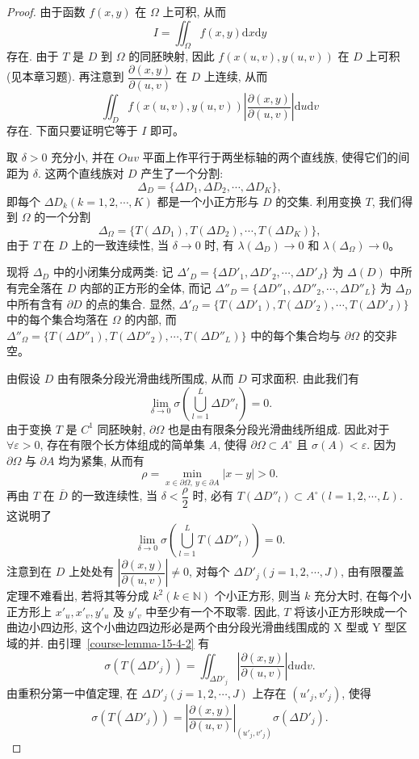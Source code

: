 \documentclass[UTF8,12pt,a4paper,fontset=fandol]{ctexart}
\begin{document}
\begin{proof}\quad 由于函数 $f(x,y)$ 在 $\Omega$ 上可积, 从而
\[
  I=\iint_\Omega f(x,y)\mathrm dx\mathrm dy
\]
存在. 由于 $T$ 是 $D$ 到 $\Omega$ 的同胚映射, 因此 $f(x(u,v),y(u,v))$ 在 $D$ 上可积(见本章习题). 再注意到 $\dfrac{\partial(x,y)}{\partial(u,v)}$ 在 $D$ 上连续, 从而
\[
  \iint_D f(x(u,v),y(u,v))
  \left|\frac{\partial(x,y)}{\partial(u,v)}\right|\mathrm du\mathrm dv
\]
存在. 下面只要证明它等于 $I$ 即可。

取 $\delta>0$ 充分小, 并在 $Ouv$ 平面上作平行于两坐标轴的两个直线族, 使得它们的间距为 $\delta$. 这两个直线族对 $D$ 产生了一个分割:
\[
  \Delta_D=\{\Delta D_1,\Delta D_2,\cdots,\Delta D_K\},
\]
即每个 $\Delta D_k(k=1,2,\cdots,K)$ 都是一个小正方形与 $D$ 的交集. 利用变换 $T$, 我们得到 $\Omega$ 的一个分割
\[
  \Delta_\Omega=\{T(\Delta D_1),T(\Delta D_2),\cdots,T(\Delta D_K)\},
\]
由于 $T$ 在 $D$ 上的一致连续性, 当 $\delta\to0$ 时, 有 $\lambda(\Delta_D)\to0$ 和 $\lambda(\Delta_\Omega)\to0$。

现将 $\Delta_D$ 中的小闭集分成两类: 记 $\Delta'_D=\{\Delta D'_1,\Delta D'_2,\cdots,\Delta D'_J\}$ 为 $\Delta(D)$ 中所有完全落在 $D$ 内部的正方形的全体, 而记 $\Delta''_D=\{\Delta D''_1,\Delta D''_2,\cdots,\Delta D''_L\}$ 为 $\Delta_D$ 中所有含有 $\partial D$ 的点的集合. 显然, $\Delta'_\Omega=\{T(\Delta D'_1),T(\Delta D'_2),\cdots,T(\Delta D'_J)\}$ 中的每个集合均落在 $\Omega$ 的内部, 而 $\Delta''_\Omega=\{T(\Delta D''_1),T(\Delta D''_2),\cdots,T(\Delta D''_L)\}$ 中的每个集合均与 $\partial\Omega$ 的交非空。

由假设 $D$ 由有限条分段光滑曲线所围成, 从而 $D$ 可求面积. 由此我们有
\[
  \lim_{\delta\to0}\sigma\left(\bigcup_{l=1}^L\Delta D''_l\right)=0.
\]
由于变换 $T$ 是 $C^1$ 同胚映射, $\partial\Omega$ 也是由有限条分段光滑曲线所组成. 因此对于 $\forall\varepsilon>0$, 存在有限个长方体组成的简单集 $A$, 使得 $\partial\Omega\subset A^\circ$ 且 $\sigma(A)<\varepsilon$. 因为 $\partial\Omega$ 与 $\partial A$ 均为紧集, 从而有
\[
  \rho=\min_{x\in\partial\Omega,\ y\in\partial A}|x-y|>0.
\]
再由 $T$ 在 $\overline D$ 的一致连续性, 当 $\delta<\dfrac\rho2$ 时, 必有 $T(\Delta D''_l)\subset A^\circ(l=1,2,\cdots,L)$. 这说明了
\[
  \lim_{\delta\to0}\sigma\left(\bigcup_{l=1}^LT(\Delta D''_l)\right)=0.
\]
注意到在 $D$ 上处处有 $\left|\dfrac{\partial(x,y)}{\partial(u,v)}\right|\ne0$, 对每个 $\Delta D'_j(j=1,2,\cdots,J)$, 由有限覆盖定理不难看出, 若将其等分成 $k^2(k\in\mathbb N)$ 个小正方形, 则当 $k$ 充分大时, 在每个小正方形上 $x'_u,x'_v,y'_u$ 及 $y'_v$ 中至少有一个不取零. 因此, $T$ 将该小正方形映成一个曲边小四边形, 这个小曲边四边形必是两个由分段光滑曲线围成的 X 型或 Y 型区域的并. 由引理~\ref{course-lemma-15-4-2}  有
\[
  \sigma(T(\Delta D'_j))
  =\iint_{\Delta D'_j}\left|\frac{\partial(x,y)}{\partial(u,v)}\right|\mathrm du\mathrm dv.
\]
由重积分第一中值定理, 在 $\Delta D'_j(j=1,2,\cdots,J)$ 上存在 $(u'_j,v'_j)$, 使得
\[
  \sigma(T(\Delta D'_j))
  =\left|\frac{\partial(x,y)}{\partial(u,v)}\right|_{(u'_j,v'_j)}
  \sigma(\Delta D'_j).
\]


\end{proof}
\end{document}
